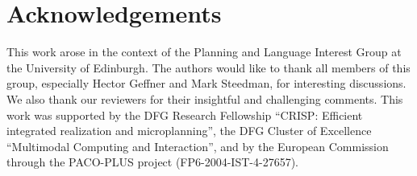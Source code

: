 \section*{Acknowledgements}

This work arose in the context of the Planning and Language Interest
Group at the University of Edinburgh. The authors would like to thank
all members of this group, especially Hector Geffner and Mark
Steedman, for interesting discussions. We also thank our reviewers for
their insightful and challenging comments.  This work was supported by
the DFG Research Fellowship ``CRISP: Efficient integrated realization
and microplanning'', the DFG Cluster of Excellence ``Multimodal
Computing and Interaction'', and by the European Commission through
the PACO-PLUS project (FP6-2004-IST-4-27657).


